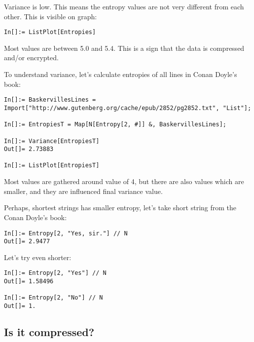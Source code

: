 Variance is low.
This means the entropy values are not very different from each other.
This is visible on graph:

\begin{lstlisting}
In[]:= ListPlot[Entropies]
\end{lstlisting}

\begin{figure}[H]
\centering
{}
\end{figure}

Most values are between 5.0 and 5.4.
This is a sign that the data is compressed and/or encrypted.

To understand variance, let's calculate entropies of all lines in Conan Doyle's  book:

\begin{lstlisting}
In[]:= BaskervillesLines = Import["http://www.gutenberg.org/cache/epub/2852/pg2852.txt", "List"];

In[]:= EntropiesT = Map[N[Entropy[2, #]] &, BaskervillesLines];

In[]:= Variance[EntropiesT]
Out[]= 2.73883

In[]:= ListPlot[EntropiesT]
\end{lstlisting}

\begin{figure}[H]
\centering
{}
\end{figure}

Most values are gathered around value of 4, but there are also values which are smaller,
and they are influenced final variance value.

Perhaps, shortest strings has smaller entropy, let's take short string from the Conan Doyle's book:

\begin{lstlisting}
In[]:= Entropy[2, "Yes, sir."] // N
Out[]= 2.9477
\end{lstlisting}

Let's try even shorter:

\begin{lstlisting}
In[]:= Entropy[2, "Yes"] // N
Out[]= 1.58496

In[]:= Entropy[2, "No"] // N
Out[]= 1.
\end{lstlisting}

\subsection{Is it compressed?}

